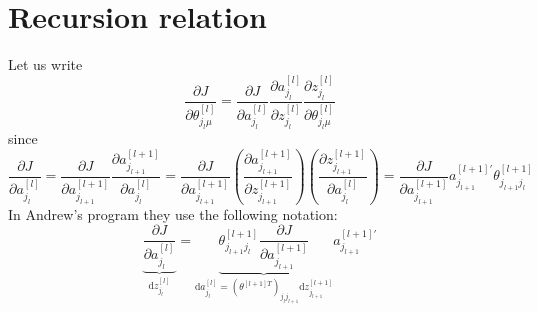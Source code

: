 \documentclass[a4paper,11pt]{article}
\newcommand{\dd}{\text{d}}
\newcommand{\na}[2]{a_{#1}^{[#2]}}
\newcommand{\nz}[2]{z_{#1}^{[#2]}}
\newcommand{\nt}[3]{\theta_{#1 #2}^{[#3]}}
\begin{document}
\section{Recursion relation}
Let us write
\begin{equation}
    \frac{\partial J }{\partial  \nt{j_l}{\mu}{l}  } 
   =\frac{\partial J  }{\partial \na{j_l}{l}   }
    \frac{\partial \na{j_l}{l}   }{\partial \nz{j_l}{l}   }
    \frac{\partial \nz{j_l}{l} }
        {\partial \nt{j_l}{\mu}{l}  }
\end{equation}
since 
\begin{equation}
\frac{\partial J  }{\partial \na{j_l}{l}   }
= \frac{\partial J  }{\partial \na{j_{l+1}}{l+1}   } \frac{\partial \na{j_{l+1}}{l+1}   }{ \partial \na{j_{l}}{l}  }
= \frac{\partial J  }{\partial \na{j_{l+1}}{l+1}   } 
  \left( \frac{\partial \na{j_{l+1}}{l+1}}   {\partial \nz{j_{l+1}}{l+1}  }\right)
   \left( \frac{\partial \nz{j_{l+1}}{l+1} }   {\partial \na{j_{l}}{l}  }\right)
=\frac{\partial J  }{\partial \na{j_{l+1}}{l+1}   } a^{[l+1]'}_{j_{l+1} }  \nt{j_{l+1}}{j_{l}}{l+1}
\end{equation}
In Andrew's program they use the following notation:
\begin{equation}
\underbrace{\frac{\partial J  }{\partial \na{j_l}{l}   }}_{\dd z_{j_l}^{[l]} }
=\underbrace{\nt{j_{l+1}}{j_{l}}{l+1} \frac{\partial J  }{\partial \na{j_{l+1}}{l+1}   }   }
_{ \dd a_{j_{l}}^{[l]}  =  (\theta^{[l+1]T} )_{j_{l} j_{l+1}}   \dd z_{j_{l+1}}^{[l+1]}  } 
a^{[l+1]'}_{j_{l+1} }
\end{equation}

\end{document}

